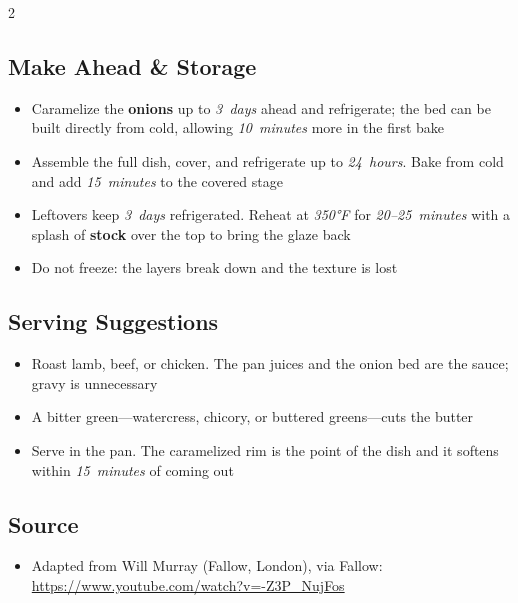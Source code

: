 \documentclass[11pt,letterpaper]{article}
\begin{document}
{\begin{multicols}{2}
\subsection*{Make Ahead \& Storage}
\begin{itemize}
    \item Caramelize the \textbf{onions} up to \textit{3~days} ahead and refrigerate; the bed can be built directly from cold, allowing \textit{10~minutes} more in the first bake
    \item Assemble the full dish, cover, and refrigerate up to \textit{24~hours}. Bake from cold and add \textit{15~minutes} to the covered stage
    \item Leftovers keep \textit{3~days} refrigerated. Reheat at \textit{350°F} for \textit{20--25~minutes} with a splash of \textbf{stock} over the top to bring the glaze back
    \item Do not freeze: the layers break down and the texture is lost
\end{itemize}

\subsection*{Serving Suggestions}
\begin{itemize}
    \item Roast lamb, beef, or chicken. The pan juices and the onion bed are the sauce; gravy is unnecessary
    \item A bitter green---watercress, chicory, or buttered greens---cuts the butter
    \item Serve in the pan. The caramelized rim is the point of the dish and it softens within \textit{15~minutes} of coming out
\end{itemize}

\subsection*{Source}
\begin{itemize}
    \item Adapted from Will Murray (Fallow, London), via Fallow: \url{https://www.youtube.com/watch?v=-Z3P_NujFos}
\end{itemize}

\end{multicols}
}
\end{document}
